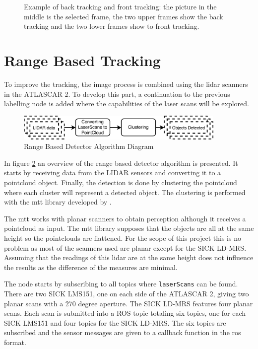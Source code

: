 \begin{figure}[htp]
	\caption{Example of back tracking and front tracking: the picture in the middle is the selected frame, the two upper frames show the back tracking and the two lower frames show to front tracking.}
	\label{fig:tracking}
	
\end{figure}

\section{Range Based Tracking}

To improve the tracking, the image process is combined using the \gls{lidar} scanners in the ATLASCAR 2. To develop this part, a continuation to the previous labelling node is added where the capabilities of the laser scans will be explored. 


\begin{figure}
	
	\centering
	\includegraphics[width=0.9\textwidth]{caplabel/imgs/mttdiagram.pdf}
	
	\caption{Range Based Detector Algorithm Diagram}
	\label{fig:mttdiagram}
	
\end{figure}

In figure \ref{fig:mttdiagram} an overview of the range based detector algorithm is presented. It starts by receiving data from the LIDAR sensors and converting it to a pointcloud object. Finally, the detection is done by clustering the pointcloud where each cluster will represent a detected object. The clustering is performed with the \gls{mtt} library developed by \cite{SoaresDeAlmeida2016a}. 

The \gls{mtt} works with planar scanners to obtain perception although it receives a pointcloud as input. The \gls{mtt} library supposes that the objects are all at the same height so the pointclouds are flattened. For the scope of this project this is no problem as most of the scanners used are planar except for the SICK LD-MRS. Assuming that the readings of this \gls{lidar} are at the same height does not influence the results as the difference of the measures are minimal. 

The node starts by subscribing to all topics where \texttt{laserScans} can be found. There are two SICK LMS151, one on each side of the ATLASCAR 2, giving two planar scans with a 270 degree aperture. The SICK LD-MRS features four planar scans. Each scan is submitted into a ROS topic totaling six topics, one for each SICK LMS151 and four topics for the SICK LD-MRS. The six topics are subscribed and the sensor messages are given to a callback function in the \gls{ros} format.

